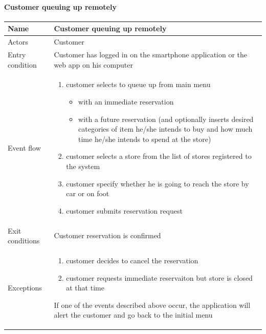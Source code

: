 \paragraph{Customer queuing up remotely}
\begin{flushleft}
	\begin{tabular} { | m{3cm} | m{10cm} | }
		\hline
		Name & Customer queuing up remotely\\
		\hline
		Actors & Customer\\
		\hline
		Entry condition & Customer has logged in on the smartphone application or the web app on his computer\\
		\hline
		Event flow & \begin{enumerate}
			\item customer selects to queue up from main menu
			\begin{itemize}
				\item with an immediate reservation
				\item with a future reservation (and optionally inserts desired categories of item he/she intends to buy and how much time he/she intends to spend at the store)
			\end{itemize}
			\item customer selects a store from the list of stores registered to the system
			\item customer specify  whether he is going to reach the store by car or on foot
			\item customer submits reservation request
		\end{enumerate}\\
		\hline
		Exit conditions & Customer reservation is confirmed\\
		\hline
		Exceptions & \begin{enumerate}
			\item customer decides to cancel the reservation
			\item customer requests immediate reservaiton but store is closed at that time
		\end{enumerate}
		If one of the events described above occur, the application will alert the customer and go back to the initial menu\\
		\hline
	\end{tabular}
\end{flushleft}

